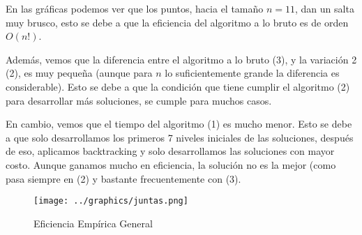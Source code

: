 \documentclass[11pt]{article}
\begin{document}
En las gráficas podemos ver que los puntos, hacia el tamaño $n=11$, dan un salta muy brusco, esto se debe a que la eficiencia del algoritmo a lo bruto es de orden $O(n!)$.

Además, vemos que la diferencia entre el algoritmo a lo bruto (3), y la variación 2 (2), es muy pequeña (aunque para $n$ lo suficientemente grande la diferencia es considerable). Esto se debe a que la condición que tiene cumplir el algoritmo (2) para desarrollar más soluciones, se cumple para muchos casos.

En cambio, vemos que el tiempo del algoritmo (1) es mucho menor. Esto se debe a que solo desarrollamos los primeros 7 niveles iniciales de las soluciones, después de eso, aplicamos backtracking y solo desarrollamos las soluciones con mayor costo. Aunque ganamos mucho en eficiencia, la solución no es la mejor (como pasa siempre en (2) y bastante frecuentemente con (3).

\begin{figure}[h]
	\centering
	\texttt{[image: ../graphics/juntas.png]}
	\caption{Eficiencia Empírica General}
\end{figure}
\end{document}

